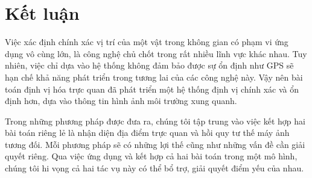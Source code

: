 \section{Kết luận}
Việc xác định chính xác vị trí của một vật trong không gian có phạm vi ứng dụng vô cùng lớn, là công nghệ chủ chốt trong rất nhiều lĩnh vực khác nhau. Tuy nhiên, việc chỉ dựa vào hệ thống không đảm bảo được sự ổn định như GPS sẽ hạn chế khả năng phát triển trong tương lai của các công nghệ này. Vậy nên bài toán định vị hóa trực quan đã phát triển một hệ thống định vị chính xác và ổn định hơn, dựa vào thông tin hình ảnh môi trường xung quanh.

Trong những phương pháp được đưa ra, chúng tôi tập trung vào việc kết hợp hai bài toán riêng lẻ là nhận diện địa điểm trực quan và hồi quy tư thế máy ảnh tương đối. Mỗi phương pháp sẽ có những lợi thế cũng như những vấn đề cần giải quyết riêng. Qua việc ứng dụng và kết hợp cả hai bài toán trong một mô hình, chúng tôi hi vọng cả hai tác vụ này có thể bổ trợ, giải quyết điểm yếu của nhau.

